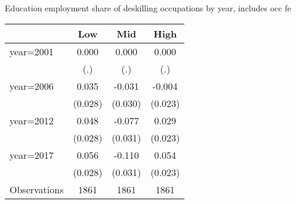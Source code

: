\begin{center}
\begin{threeparttable}[!h]
\caption{Education employment share of deskilling occupations by year, includes occ fe}
\begin{tabular}{lccc}
\toprule
\toprule
\textbf{}&\multicolumn{1}{c}{\textbf{Low}}&\multicolumn{1}{c}{\textbf{Mid}}&\multicolumn{1}{c}{\textbf{High}} \\
\midrule
year=2001           &       0.000&       0.000&       0.000\\
                    &         (.)&         (.)&         (.)\\
year=2006           &       0.035&      -0.031&      -0.004\\
                    &     (0.028)&     (0.030)&     (0.023)\\
year=2012           &       0.048&      -0.077&       0.029\\
                    &     (0.028)&     (0.031)&     (0.023)\\
year=2017           &       0.056&      -0.110&       0.054\\
                    &     (0.028)&     (0.031)&     (0.023)\\
Observations        &        1861&        1861&        1861\\
\bottomrule
\bottomrule
\end{tabular}
\end{threeparttable}
\end{center}
